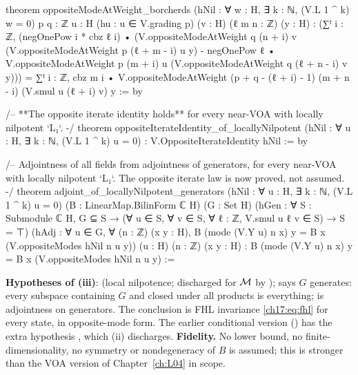 \begin{leancode}
theorem oppositeModeAtWeight_borcherds (hNil : ∀ w : H, ∃ k : ℕ, (V.L 1 ^ k) w = 0)
    {p q : ℤ} {u : H} (hu : u ∈ V.grading p) (v : H) (ℓ m n : ℤ) (y : H) :
    (∑ᶠ i : ℤ, (negOnePow i * cbz ℓ i) •
        (V.oppositeModeAtWeight q (n + i) v (V.oppositeModeAtWeight p (ℓ + m - i) u y)
          - negOnePow ℓ • V.oppositeModeAtWeight p (m + i) u
              (V.oppositeModeAtWeight q (ℓ + n - i) v y)))
      = ∑ᶠ i : ℤ, cbz m i •
          V.oppositeModeAtWeight (p + q - (ℓ + i) - 1) (m + n - i) (V.smul u (ℓ + i) v) y := by

/-- **The opposite iterate identity holds** for every near-VOA with locally nilpotent `L₁`. -/
theorem oppositeIterateIdentity_of_locallyNilpotent
    (hNil : ∀ u : H, ∃ k : ℕ, (V.L 1 ^ k) u = 0) : V.OppositeIterateIdentity hNil := by

/-- Adjointness of all fields from adjointness of generators, for every near-VOA with
locally nilpotent `L₁`. The opposite iterate law is now proved, not assumed. -/
theorem adjoint_of_locallyNilpotent_generators
    (hNil : ∀ u : H, ∃ k : ℕ, (V.L 1 ^ k) u = 0) (B : LinearMap.BilinForm ℂ H) (G : Set H)
    (hGen : ∀ S : Submodule ℂ H, G ⊆ S →
      (∀ u ∈ S, ∀ v ∈ S, ∀ ℓ : ℤ, V.smul u ℓ v ∈ S) → S = ⊤)
    (hAdj : ∀ u ∈ G, ∀ (n : ℤ) (x y : H),
      B (mode (V.Y u) n x) y = B x (V.oppositeModes hNil n u y))
    (u : H) (n : ℤ) (x y : H) :
    B (mode (V.Y u) n x) y = B x (V.oppositeModes hNil n u y) :=
\end{leancode}

\begin{dictionary}
\textbf{Hypotheses of (iii)}:  (local nilpotence; discharged for $\mathcal{M}$ by
);  says $G$ generates: every subspace containing $G$ and
closed under all products is everything;  is adjointness on generators.  The conclusion is FHL invariance
\eqref{ch17:eq:fhl} for every state, in opposite-mode form.  The earlier conditional version
 () has the extra
hypothesis , which (ii) discharges.  \textbf{Fidelity.} No lower bound, no
finite-dimensionality, no symmetry or nondegeneracy of $B$ is assumed; this is stronger than the VOA version of
Chapter~\ref{ch:L04} in scope.
\end{dictionary}

